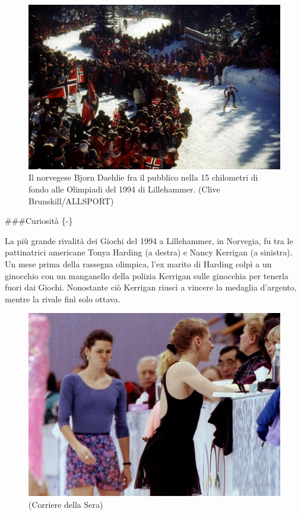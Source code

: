 \documentclass[
]{book}
\begin{document}
\begin{figure}
\includegraphics[width=0.8\linewidth]{images/IlPost/1994(2)} \caption{Il norvegese Bjorn Daehlie fra il pubblico nella 15 chilometri di fondo alle Olimpiadi del 1994 di Lillehammer. (Clive Brunskill/ALLSPORT)}\label{fig:unnamed-chunk-59}
\end{figure}

\#\#\#Curiosità \{-\}

La più grande rivalità dei Giochi del 1994 a Lillehammer, in Norvegia, fu tra le pattinatrici americane Tonya Harding (a destra) e Nancy Kerrigan (a sinistra). Un mese prima della rassegna olimpica, l'ex marito di Harding colpì a un ginocchio con un manganello della polizia Kerrigan sulle ginocchia per tenerla fuori dai Giochi. Nonostante ciò Kerrigan riuscì a vincere la medaglia d'argento, mentre la rivale finì solo ottava.

\begin{figure}
\includegraphics[width=0.8\linewidth]{images/corriere/1994} \caption{(Corriere della Sera)}\label{fig:unnamed-chunk-60}
\end{figure}
\end{document}
